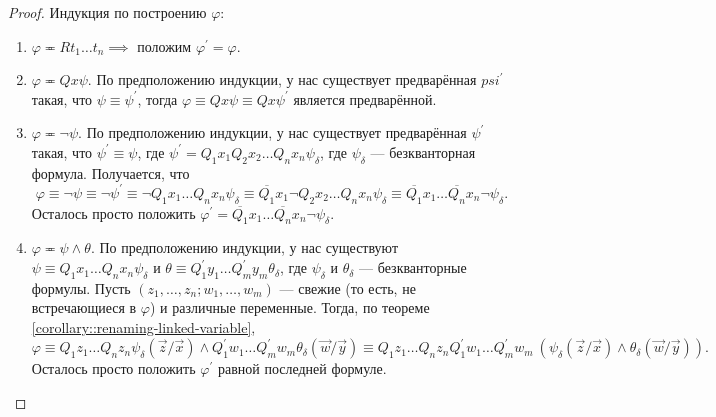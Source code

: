 \begin{proof}
    Индукция по построению $\varphi$:
    \begin{enumerate}
        \item $\varphi \eqcirc Rt_{1} \ldots t_{n} \implies$ положим $\varphi^{\prime} = \varphi$.
        \item $\varphi \eqcirc Qx \psi$.
        По предположению индукции, у нас существует предварённая $psi^{\prime}$ такая, что $\psi \equiv \psi^{\prime}$, тогда $\varphi \equiv Qx\psi \equiv Qx \psi^{\prime}$ является предварённой.
        \item $\varphi \eqcirc \neg \psi$.
        По предположению индукции, у нас существует предварённая $\psi^{\prime}$ такая, что $\psi^{\prime} \equiv \psi$, где $\psi^{\prime} = Q_{1}x_{1} Q_{2}x_{2} \ldots Q_{n}x_{n} \psi_{\delta}$, где $\psi_{\delta}$ --- безкванторная формула.
        Получается, что
        $$
            \varphi \equiv \neg \psi \equiv \neg \psi^{\prime} \equiv \neg Q_{1}x_{1} \ldots Q_{n}x_{n} \psi_{\delta} \equiv \overline{Q_{1}}x_{1} \neg Q_{2}x_{2} \ldots Q_{n}x_{n} \psi_{\delta} \equiv \overline{Q_{1}}x_{1} \ldots \overline{Q_{n}}x_{n} \neg \psi_{\delta}.
        $$
        Осталось просто положить $\varphi^{\prime} = \overline{Q_{1}}x_{1} \ldots \overline{Q_{n}}x_{n} \neg \psi_{\delta}$.
        \item $\varphi \eqcirc \psi \land \theta$.
        По предположению индукции, у нас существуют $\psi \equiv Q_{1}x_{1} \ldots Q_{n}x_{n} \psi_{\delta}$ и $\theta \equiv Q_{1}^{\prime}y_{1} \ldots Q_{m}^{\prime}y_{m} \theta_{\delta}$, где $\psi_{\delta}$ и $\theta_{\delta}$ --- безкванторные формулы.
        Пусть $(z_{1}, \ldots, z_{n}; w_{1}, \ldots, w_{m})$ --- свежие (то есть, не встречающиеся в $\varphi$) и различные переменные.
        Тогда, по теореме \ref{corollary::renaming-linked-variable},
        $$
            \varphi \equiv Q_{1}z_{1} \ldots Q_{n}z_{n}\psi_{\delta}(\vec{z}/\vec{x}) \land Q_{1}^{\prime}w_{1} \ldots Q_{m}^{\prime} w_{m} \theta_{\delta}(\vec{w}/\vec{y}) \equiv Q_{1}z_{1} \ldots Q_{n}z_{n} Q_{1}^{\prime}w_{1} \ldots Q_{m}^{\prime}w_{m}~(\psi_{\delta}(\vec{z}/\vec{x}) \land \theta_{\delta}(\vec{w}/\vec{y})).
        $$
        Осталось просто положить $\varphi^{\prime}$ равной последней формуле. \qedhere
    \end{enumerate}
\end{proof}